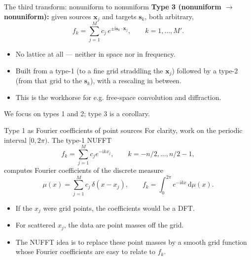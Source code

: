 \documentclass[aspectratio=169,11pt]{beamer}
\newcommand{\dd}{\,\mathrm d}
\newcommand{\ii}{\mathrm i}
\newcommand{\x}{\bm{x}}
\newcommand{\svec}{\bm{s}}
\newcommand{\hl}[1]{{\color{CCMorange}\textbf{#1}}}
\begin{document}
\begin{frame}{The third transform: nonuniform to nonuniform}
\small
\hl{Type 3 (nonuniform \(\to\) nonuniform):} given sources \(\x_j\) and targets \(\svec_k\), both arbitrary,
\[
  f_k=\sum_{j=1}^{M} c_j\, e^{\pm \ii \svec_k\cdot \x_j},\qquad k=1,\dots,M'.
\]
\begin{itemize}
  \item No lattice at all --- neither in space nor in frequency.
  \item Built from a type-1 (to a fine grid straddling the \(\x_j\)) followed by a type-2 (from that grid to the \(\svec_k\)), with a rescaling in between.
  \item This is the workhorse for e.g. free-space convolution and diffraction.
\end{itemize}
\vspace{1mm}
\begin{center}
\end{center}
We focus on types 1 and 2; type 3 is a corollary.
\end{frame}

\begin{frame}{Type 1 as Fourier coefficients of point sources}
\small
For clarity, work on the periodic interval \([0,2\pi)\).  The type-1 NUFFT
\[
  f_k=\sum_{j=1}^{M} c_j e^{-\ii kx_j},\qquad
  k=-n/2,\ldots,n/2-1,
\]
computes Fourier coefficients of the discrete measure
\[
  \mu(x)=\sum_{j=1}^{M} c_j\,\delta(x-x_j),
  \qquad
  f_k=\int_0^{2\pi} e^{-\ii kx}\dd\mu(x).
\]
\begin{itemize}
  \item If the \(x_j\) were grid points, the coefficients would be a DFT.
  \item For scattered \(x_j\), the data are point masses off the grid.
  \item The NUFFT idea is to replace these point masses by a smooth grid
  function whose Fourier coefficients are easy to relate to \(f_k\).
\end{itemize}
\end{frame}
\end{document}
